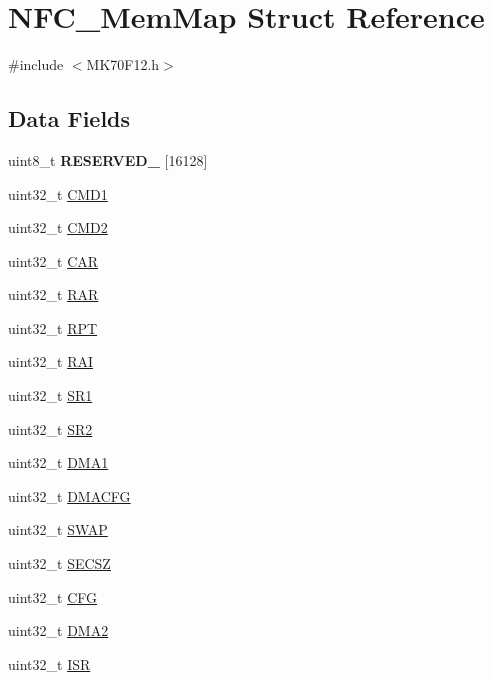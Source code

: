 \hypertarget{struct_n_f_c___mem_map}{}\section{N\+F\+C\+\_\+\+Mem\+Map Struct Reference}
\label{struct_n_f_c___mem_map}


{\ttfamily \#include $<$M\+K70\+F12.\+h$>$}

\subsection*{Data Fields}
\begin{DoxyCompactItemize}
\item 
\hypertarget{struct_n_f_c___mem_map_a0bd869c5d25d0520013afef75893a61e}{}uint8\+\_\+t {\bfseries R\+E\+S\+E\+R\+V\+E\+D\+\_} \mbox{[}16128\mbox{]}\label{struct_n_f_c___mem_map_a0bd869c5d25d0520013afef75893a61e}

\item 
uint32\+\_\+t \hyperlink{struct_n_f_c___mem_map_a38a4f2f5e205a3efabe1b57a630df44a}{C\+M\+D1}
\item 
uint32\+\_\+t \hyperlink{struct_n_f_c___mem_map_a0445e1306dc6c5367e5fcbe28af5549d}{C\+M\+D2}
\item 
uint32\+\_\+t \hyperlink{struct_n_f_c___mem_map_aa3489d3c17a78186e56e52e2a6a13fd5}{C\+A\+R}
\item 
uint32\+\_\+t \hyperlink{struct_n_f_c___mem_map_a3f377c9911d9d67731bb4df00fdfd4ce}{R\+A\+R}
\item 
uint32\+\_\+t \hyperlink{struct_n_f_c___mem_map_a04979c6bc6304d65c8eb943a841f147a}{R\+P\+T}
\item 
uint32\+\_\+t \hyperlink{struct_n_f_c___mem_map_ac1117c3d35d9348dac417db834474995}{R\+A\+I}
\item 
uint32\+\_\+t \hyperlink{struct_n_f_c___mem_map_aa8cce6d11c86d6e15a8dcb5df513627e}{S\+R1}
\item 
uint32\+\_\+t \hyperlink{struct_n_f_c___mem_map_ac3b02492f50adbb1ec4c964536f627b6}{S\+R2}
\item 
uint32\+\_\+t \hyperlink{struct_n_f_c___mem_map_a32bec2bfd84ae10fe9ddaaab24ff5c22}{D\+M\+A1}
\item 
uint32\+\_\+t \hyperlink{struct_n_f_c___mem_map_a2298f2d3e420d2c1fce42acf53f21162}{D\+M\+A\+C\+F\+G}
\item 
uint32\+\_\+t \hyperlink{struct_n_f_c___mem_map_acb4d1261ff3c34b54bc5c14496f742ac}{S\+W\+A\+P}
\item 
uint32\+\_\+t \hyperlink{struct_n_f_c___mem_map_a8263ed8790e41b153858d933ec8c7fef}{S\+E\+C\+S\+Z}
\item 
uint32\+\_\+t \hyperlink{struct_n_f_c___mem_map_ae368f579cd01d726ce07b35082b929ac}{C\+F\+G}
\item 
uint32\+\_\+t \hyperlink{struct_n_f_c___mem_map_aa2667641c24abf862e7607182a7be1cb}{D\+M\+A2}
\item 
uint32\+\_\+t \hyperlink{struct_n_f_c___mem_map_ab881e0b3bb6ef5ea9a34096c0968cedb}{I\+S\+R}
\end{DoxyCompactItemize}



